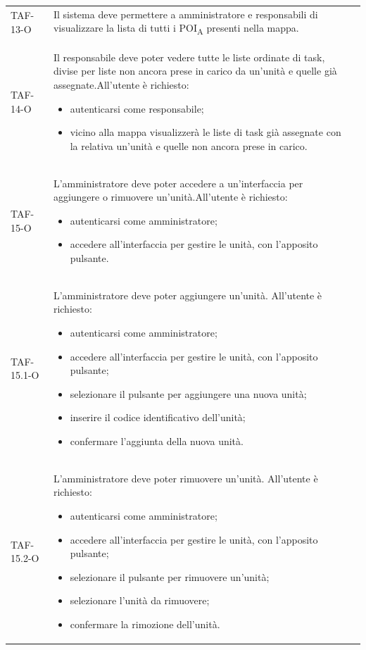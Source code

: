 \begin{longtable}{ >{\centering}p{} >{}p{}
		>{\centering}p{}}
	TAF-13-O & Il sistema deve permettere a amministratore e responsabili di visualizzare la lista di tutti i POI\textsubscript{A} presenti nella mappa. & 0\tabularnewline

	TAF-14-O & Il responsabile deve poter vedere tutte le liste ordinate di task, divise per liste non ancora prese in carico da un'unità e quelle già assegnate.\newline All'utente è richiesto:\begin{itemize} \item autenticarsi come responsabile; \item vicino alla mappa visualizzerà le liste di task già assegnate con la relativa un'unità e quelle non ancora prese in carico. \end{itemize} & 0\tabularnewline

	TAF-15-O & L'amministratore deve poter accedere a un'interfaccia per aggiungere o rimuovere un'unità.\newline All'utente è richiesto: \begin{itemize} \item autenticarsi come amministratore; \item accedere all'interfaccia per gestire le unità, con l'apposito pulsante.\end{itemize} & 0\tabularnewline
	TAF-15.1-O & L'amministratore deve poter aggiungere un'unità. \newline All'utente è richiesto: \begin{itemize} \item autenticarsi come amministratore; \item accedere all'interfaccia per gestire le unità, con l'apposito pulsante; \item selezionare il pulsante per aggiungere una nuova unità; \item inserire il codice identificativo dell'unità; \item confermare l'aggiunta della nuova unità.\end{itemize} & 0\tabularnewline
	
	TAF-15.2-O & L'amministratore deve poter rimuovere un'unità. \newline All'utente è richiesto: \begin{itemize} \item autenticarsi come amministratore; \item accedere all'interfaccia per gestire le unità, con l'apposito pulsante; \item selezionare il pulsante per rimuovere un'unità; \item selezionare l'unità da rimuovere; \item confermare la rimozione dell'unità.\end{itemize} & 0\tabularnewline
	

\end{longtable}
